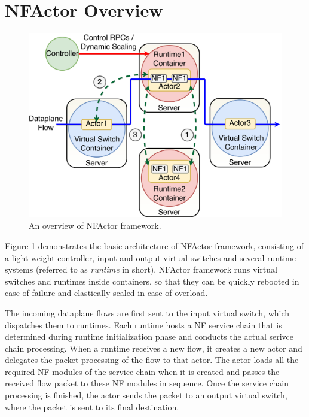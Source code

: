 \section {NFActor Overview}

\begin{figure}[!t]
  \centering
  \includegraphics[width=\columnwidth]{figure/final-final-nfactor-cluster.pdf}
  \caption{An overview of NFActor framework.}
  \label{fig:runtime}
\end{figure}

Figure \ref{fig:runtime} demonstrates the basic architecture of NFActor framework, consisting of a light-weight controller, input and output virtual switches and several runtime systems (referred to as \textit{runtime} in short). NFActor framework runs virtual switches and runtimes inside containers, so that they can be quickly rebooted in case of failure and elastically scaled in case of overload.

The incoming dataplane flows are first sent to the input virtual switch, which dispatches them to runtimes. Each runtime hosts a NF service chain that is determined during runtime initialization phase and conducts the actual serivce chain processing. When a runtime receives a new flow, it creates a new actor and delegates the packet processing of the flow to that actor. The actor loads all the required NF modules of the service chain when it is created and passes the received flow packet to these NF modules in sequence. Once the service chain processing is finished, the actor sends the packet to an output virtual switch, where the packet is sent to its final destination.


